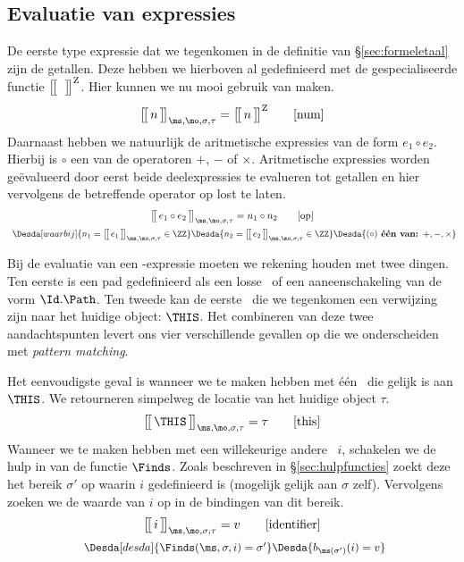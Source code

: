\subsection{Evaluatie van expressies}

De eerste type expressie dat we tegenkomen in de definitie van §\ref{sec:formeletaal} zijn de getallen. Deze hebben we hierboven al gedefinieerd met de gespecialiseerde functie $\Express[Z]{\;}{}$. Hier kunnen we nu mooi gebruik van maken.
%
\begin{equation*}
  \Express{n}{\ms,\mo,\sigma,\tau} = \Express[Z]{n}{}
  \tag*{[num]}
\end{equation*}
%
Daarnaast hebben we natuurlijk de aritmetische expressies van de form $e_1 \circ e_2$. Hierbij is $\circ$ een van de operatoren $+$, $-$ of $\times$. Aritmetische expressies worden geëvalueerd door eerst beide deelexpressies te evalueren tot getallen en hier vervolgens de betreffende operator op lost te laten.
%
\begin{gather*}
  \Express{e_1 \circ e_2}{\ms,\mo,\sigma,\tau} = n_1 \circ n_2
  \tag*{[op]} \\
  \Desdas{
    \Desda[waarbij]{n_1 = \Express{e_1}{\ms,\mo,\sigma,\tau} \in \ZZ}
    \Desda{n_2 = \Express{e_2}{\ms,\mo,\sigma,\tau} \in \ZZ}
    \Desda{(\circ) \textbf{ één van: } +, -, \times}
  }
\end{gather*}

Bij de evaluatie van een \Path-expressie moeten we rekening houden met twee dingen. Ten eerste is een pad gedefinieerd als een losse \Id\ of een aaneenschakeling van de vorm $\Id.\Path$. Ten tweede kan de eerste \Id\ die we tegenkomen een verwijzing zijn naar het huidige object: $\THIS$. Het combineren van deze twee aandachtspunten levert ons vier verschillende gevallen op die we onderscheiden met \emph{pattern matching}.

Het eenvoudigste geval is wanneer we te maken hebben met één \Id\ die gelijk is aan $\THIS$. We retourneren simpelweg de locatie van het huidige object $\tau$.
%
\begin{equation*}
  \Express{\THIS}{\ms,\mo,\sigma,\tau} = \tau
  \tag*{[this]}
\end{equation*}
%
Wanneer we te maken hebben met een willekeurige andere \Id\ $i$, schakelen we de hulp in van de functie $\Finds$. Zoals beschreven in §\ref{sec:hulpfuncties} zoekt deze het bereik $\sigma'$ op waarin $i$ gedefinieerd is (mogelijk gelijk aan $\sigma$ zelf). Vervolgens zoeken we de waarde van $i$ op in de bindingen van dit bereik.
%
\begin{gather*}
  \Express{i}{\ms,\mo,\sigma,\tau} = v
  \tag*{[identifier]}\label{rul:identifier} \\
  \Desdas{
    \Desda[desda]{\Finds(\ms, \sigma, i) = \sigma'}
    \Desda{b_{\ms(\sigma')}(i) = v}
  }
\end{gather*}

